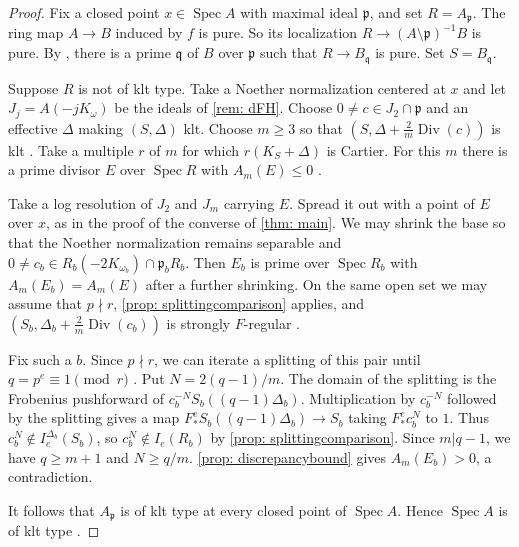 \documentclass[11pt,leqno]{amsart}
\numberwithin{equation}{section}
\theoremstyle{definition}
\theoremstyle{remark}
\newcommand{\Spec}{\operatorname{Spec}}
\newcommand{\Div}{\operatorname{Div}}
\begin{document}
\begin{proof}
Fix a closed point $x\in\Spec A$ with maximal ideal $\mathfrak p$, and set $R=A_{\mathfrak p}$. The ring map $A\to B$ induced by $f$ is pure. So its localization $R\to (A\setminus\mathfrak p)^{-1}B$ is pure. By \cite[Lemma 2.4]{hashimoto23}, there is a prime $\mathfrak q$ of $B$ over $\mathfrak p$ such that $R\to B_{\mathfrak q}$ is pure. Set $S=B_{\mathfrak q}$.

Suppose $R$ is not of klt type. Take a Noether normalization centered at $x$ and let $J_j = A(-jK_\omega)$ be the ideals of \cref{rem: dFH}. Choose $0 \ne c \in J_2 \cap \mathfrak{p}$ and an effective $\Delta$ making $(S,\Delta)$ klt. Choose $m \geq 3$ so that $(S,\Delta + \tfrac{2}{m}\Div(c))$ is klt \cite[Corollary 2.35(2)]{kollarmori}. Take a multiple $r$ of $m$ for which $r(K_S + \Delta)$ is Cartier. For this $m$ there is a prime divisor $E$ over $\Spec R$ with $A_m(E) \leq 0$ \cite[Definition 7.1 and Proposition 7.2]{dFH09}.

Take a log resolution of $J_2$ and $J_m$ carrying $E$. Spread it out with a point of $E$ over $x$, as in the proof of the converse of \cref{thm: main}. We may shrink the base so that the Noether normalization remains separable and $0\ne c_b\in R_b(-2K_{\omega_b})\cap\mathfrak{p}_bR_b$. Then $E_b$ is prime over $\Spec R_b$ with $A_m(E_b)=A_m(E)$ after a further shrinking. On the same open set we may assume that $p \nmid r$, \cref{prop: splittingcomparison} applies, and $(S_b,\Delta_b + \tfrac{2}{m}\Div(c_b))$ is strongly $F$-regular \cite[Corollary 3.4]{takagi04}.

Fix such a $b$. Since $p \nmid r$, we can iterate a splitting of this pair until $q = p^e \equiv 1\pmod r$ \cite[Chapter 5, Proposition 2.2]{SSbook}. Put $N = 2(q - 1)/m$. The domain of the splitting is the Frobenius pushforward of $c_b^{-N}S_b((q-1)\Delta_b)$. Multiplication by $c_b^{-N}$ followed by the splitting gives a map $F^e_*S_b((q - 1)\Delta_b) \to S_b$ taking $F^e_*c_b^N$ to $1$. Thus $c_b^N \notin I_e^{\Delta_b}(S_b)$, so $c_b^N \notin I_e(R_b)$ by \cref{prop: splittingcomparison}. Since $m | q - 1$, we have $q \geq m + 1$ and $N \geq q/m$. \cref{prop: discrepancybound} gives $A_m(E_b) > 0$, a contradiction.

It follows that $A_{\mathfrak{p}}$ is of klt type at every closed point of $\Spec A$. Hence $\Spec A$ is of klt type \cite[Proposition 7.2 and Corollary 7.6]{dFH09}.
\end{proof}





\end{document}
